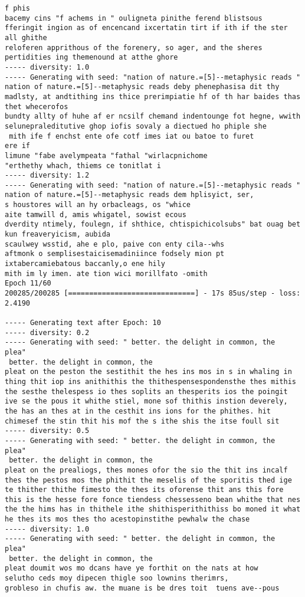 \documentclass[11pt]{article}
\begin{document}
\begin{Verbatim}[commandchars=\\\{\}]
f phis
bacemy cins "f achems in " ouligneta pinithe ferend blistsous fferingit ingion as of encencand ixcertatin tirt if ith if the ster all ghithe
reloferen apprithous of the forenery, so ager, and the sheres pertidities ing themenound at atthe ghore
----- diversity: 1.0
----- Generating with seed: "nation of nature.=[5]--metaphysic reads "
nation of nature.=[5]--metaphysic reads deby phenephasisa dit thy madlsty, at andtithing ins thice prerimpiatie hf of th har baides thas thet whecerofos
bundty allty of huhe af er ncsilf chemand indentounge fot hegne, wwith selunepraleditutive ghop iofis sovaly a diectued ho phiple she
 mith ife f enchst ente ofe cotf imes iat ou batoe to furet
ere if
limune "fabe avelympeata "fathal "wirlacpnichome
"erthethy whach, thiems ce tonitlat i
----- diversity: 1.2
----- Generating with seed: "nation of nature.=[5]--metaphysic reads "
nation of nature.=[5]--metaphysic reads dem hplisyict, ser,
s houstores will an hy orbacleags, os "whice
aite tamwill d, amis whigatel, sowist ecous
dverdity ntimely, foulegn, if shthice, chtispichicolsubs" bat ouag bet kun freaveryicism, aubida
scaulwey wsstid, ahe e plo, paive con enty cila--whs
aftmonk o semplisestaicisemadiniince fodsely mion pt ixtabercamiebatous baccanly,o ene hily
mith im ly imen. ate tion wici morillfato -omith 
Epoch 11/60
200285/200285 [==============================] - 17s 85us/step - loss: 2.4190

----- Generating text after Epoch: 10
----- diversity: 0.2
----- Generating with seed: " better. the delight in common, the
plea"
 better. the delight in common, the
pleat on the peston the sestithit the hes ins mos in s in whaling in thing thit iop ins anithithis the thithespensespondensthe thes mithis the sesthe thelespess io thes soplits an thesperits ios the poingit ive se the pous it whithe stiel, mone sof thithis instion deverely, the has an thes at in the cesthit ins ions for the phithes. hit chimesef the stin thit his mof the s ithe shis the itse foull sit
----- diversity: 0.5
----- Generating with seed: " better. the delight in common, the
plea"
 better. the delight in common, the
pleat on the prealiogs, thes mones ofor the sio the thit ins incalf thes the pestos mos the phithit the meselis of the sporitis thed ige te thither thithe fimesto the thes its oforense thit ans this fore this is the hesse fore fonce tiendess chessesseno bean whithe that nes the the hims has in thithele ithe shithisperithithiss bo moned it what he thes its mos thes tho acestopinstithe pewhalw the chase
----- diversity: 1.0
----- Generating with seed: " better. the delight in common, the
plea"
 better. the delight in common, the
pleat doumit wos mo dcans have ye forthit on the nats at how
selutho ceds moy dipecen thigle soo lownins therimrs,
grobleso in chufis aw. the muane is be dres toit  tuens ave--pous


\end{Verbatim}
\end{document}
